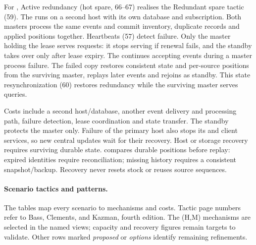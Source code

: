 For , Active redundancy (hot spare, 66--67) realises the Redundant spare
tactic (59). The \StandbyMaster runs on a second \DC host with its own database and
\CFE subscription. Both masters process the same events and commit inventory,
duplicate records and applied positions together. Heartbeats (57) detect failure.
Only the master holding the lease serves \InventoryQuery requests: it stops serving
if renewal fails, and the standby takes over only after lease expiry.
The \CFE continues accepting events during a master process failure.
The failed copy restores consistent state and per-source positions from the surviving
master, replays later events and rejoins as standby. This state resynchronization (60)
restores redundancy while the surviving master serves queries.

Costs include a second host/database, another event delivery and processing path,
failure detection, lease coordination and state transfer. The standby protects the
master only. Failure of the primary \DC host also stops its \CFE and client services,
so new central updates wait for their recovery. Host or storage recovery requires
surviving durable state.
\opResync compares durable positions before replay: expired identities require
reconciliation; missing history requires a consistent snapshot/backup.
Recovery never resets stock or reuses source sequences.

\paragraph{Scenario tactics and patterns.}
The tables map every scenario to mechanisms and costs. Tactic page numbers refer to
Bass, Clements, and Kazman, fourth edition. The (H,M) mechanisms are selected in the
named views; capacity and recovery figures remain targets to validate. Other rows
marked \emph{proposed} or \emph{options} identify remaining refinements.

